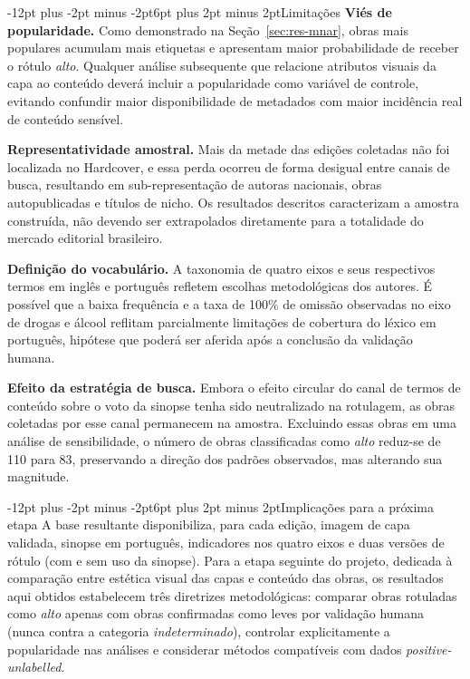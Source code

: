 \documentclass[12pt]{article}
\makeatletter
\renewcommand{\subsection}{\@startsection{subsection}{2}{\z@}%
  {-12pt plus -2pt minus -2pt}{6pt plus 2pt minus 2pt}{\normalfont\normalsize\bfseries}}
\makeatother
\begin{document}
\subsection{Limitações}
\textbf{Viés de popularidade.} Como demonstrado na Seção~\ref{sec:res-mnar}, obras mais populares acumulam mais etiquetas e apresentam maior probabilidade de receber o rótulo \emph{alto}. Qualquer análise subsequente que relacione atributos visuais da capa ao conteúdo deverá incluir a popularidade como variável de controle, evitando confundir maior disponibilidade de metadados com maior incidência real de conteúdo sensível.

\textbf{Representatividade amostral.} Mais da metade das edições coletadas não foi localizada no Hardcover, e essa perda ocorreu de forma desigual entre canais de busca, resultando em sub-representação de autoras nacionais, obras autopublicadas e títulos de nicho. Os resultados descritos caracterizam a amostra construída, não devendo ser extrapolados diretamente para a totalidade do mercado editorial brasileiro.

\textbf{Definição do vocabulário.} A taxonomia de quatro eixos e seus respectivos termos em inglês e português refletem escolhas metodológicas dos autores. É possível que a baixa frequência e a taxa de 100\% de omissão observadas no eixo de drogas e álcool reflitam parcialmente limitações de cobertura do léxico em português, hipótese que poderá ser aferida após a conclusão da validação humana.

\textbf{Efeito da estratégia de busca.} Embora o efeito circular do canal de termos de conteúdo sobre o voto da sinopse tenha sido neutralizado na rotulagem, as obras coletadas por esse canal permanecem na amostra. Excluindo essas obras em uma análise de sensibilidade, o número de obras classificadas como \emph{alto} reduz-se de 110 para 83, preservando a direção dos padrões observados, mas alterando sua magnitude.

\subsection{Implicações para a próxima etapa}
A base resultante disponibiliza, para cada edição, imagem de capa validada, sinopse em português, indicadores nos quatro eixos e duas versões de rótulo (com e sem uso da sinopse). Para a etapa seguinte do projeto, dedicada à comparação entre estética visual das capas e conteúdo das obras, os resultados aqui obtidos estabelecem três diretrizes metodológicas: comparar obras rotuladas como \emph{alto} apenas com obras confirmadas como leves por validação humana (nunca contra a categoria \emph{indeterminado}), controlar explicitamente a popularidade nas análises e considerar métodos compatíveis com dados \emph{positive-unlabelled}.
\end{document}

